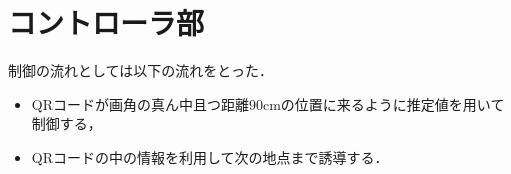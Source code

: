 \section{コントローラ部}
\label{implement_controller}
制御の流れとしては以下の流れをとった．
\begin{itemize}
    \item QRコードが画角の真ん中且つ距離90cmの位置に来るように推定値を用いて制御する，
    \item QRコードの中の情報を利用して次の地点まで誘導する．
\end{itemize}
